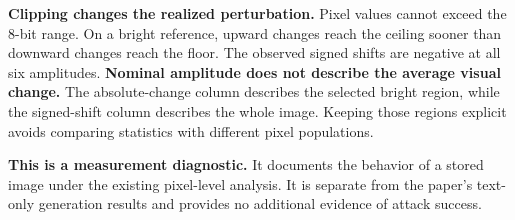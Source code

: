 \textbf{Clipping changes the realized perturbation.} Pixel values cannot exceed the 8-bit range. On a bright reference, upward changes reach the ceiling sooner than downward changes reach the floor. The observed signed shifts are negative at all six amplitudes.
\newpage
\textbf{Nominal amplitude does not describe the average visual change.} The absolute-change column describes the selected bright region, while the signed-shift column describes the whole image. Keeping those regions explicit avoids comparing statistics with different pixel populations.

\textbf{This is a measurement diagnostic.} It documents the behavior of a stored image under the existing pixel-level analysis. It is separate from the paper's text-only generation results and provides no additional evidence of attack success.
